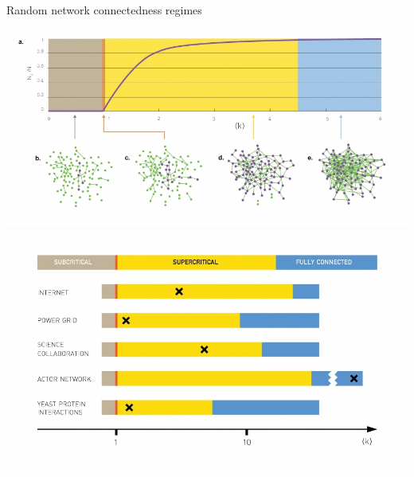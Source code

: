 \documentclass[notes]{beamer}
\begin{document}
\begin{frame}{Random network connectedness regimes}
  \centering
  \includegraphics[width=.6\textwidth]{Figures/randomRegimes.jpg} \\
  \includegraphics[width=.7\textwidth]{Figures/randomRegimeCompareRealworld.jpg}
\end{frame}
\end{document}
